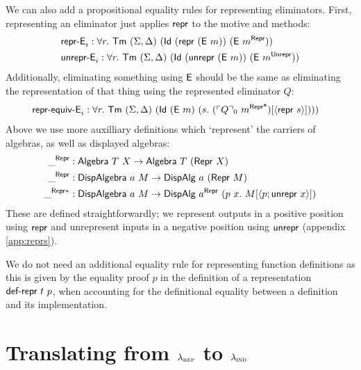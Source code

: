 We can also add a propositional equality rules for representing eliminators.
First, representing an eliminator just applies $\textsf{repr}$ to the motive and methods:
\begin{align*}
&\mta{repr-E}_i : \forall r.\ \Tm\ (\Sigma, \Delta)\ (\mta{Id}\ (\Mrepr\ (\mta{E}\ m))\ (\mta{E}\ m^\mta{Repr})) \\
&\mta{unrepr-E}_i : \forall r.\ \Tm\ (\Sigma, \Delta)\ (\mta{Id}\ (\Munrepr\ (\mta{E}\ m))\ (\mta{E}\ m^\mta{Unrepr}))
\end{align*}
Additionally, eliminating something using $\textsf{E}$ should be the same as
eliminating the representation of that thing using the represented eliminator $Q$:
\begin{align*}
&\mta{repr-equiv-E}_i : \forall r.\ \Tm\ (\Sigma, \Delta)\ (\mta{Id}\ (\mta{E}\ m)\ (s.\ (\emb{Q}_0\ m^{\mta{Repr*}})[\Msub{\mta{repr}\ s}])))
\end{align*}
Above we use more auxilliary definitions which `represent' the carriers of
algebras, as well as displayed algebras:
\begin{align*}
\_^{\mta{Repr}} &: \mta{Algebra}\ T\ X \to \mta{Algebra}\ T\ (\mta{Repr}\ X) \\
 \_^{\mta{Repr}} &: \mta{DispAlgebra}\ a\ M \to \mta{DispAlg}\ a\ (\MRepr\ M) \\
 \_^{\mta{Repr}*} &: \mta{DispAlgebra}\ a\ M \to \mta{DispAlg}\ a^{\mta{Repr}}\ (p\ x .\ M[\Msub{p;\mta{unrepr}\ x}])
\end{align*}
These are defined straightforwardly; we represent outputs in a positive position
using $\textsf{repr}$ and unrepresent inputs in a negative position using
$\textsf{unrepr}$ (appendix \cref{app:reprs}).

We do not need an additional equality rule for representing function definitions
as this is given by the equality proof $p$ in the definition of a
representation $\textsf{def-repr}\ t\ p$, when accounting for the definitional
equality between a definition and its implementation.

\section{Translating from $\lambda_{\textsc{rep}}$ to $\lambda_{\textsc{ind}}$}

